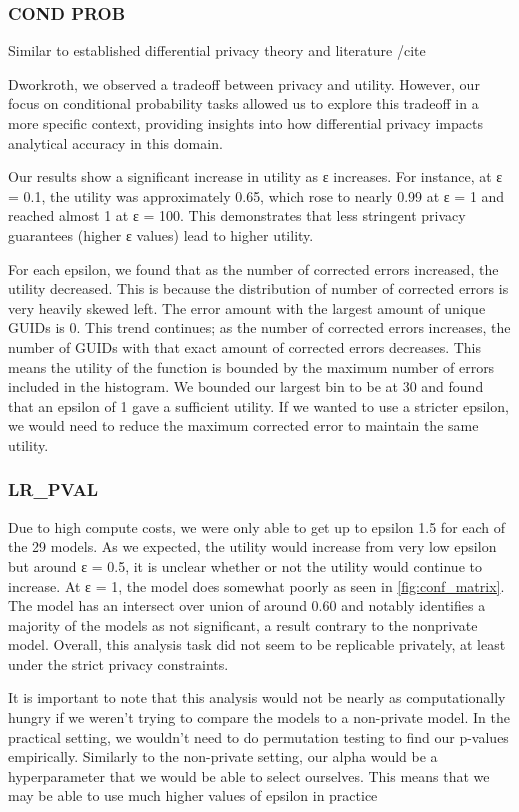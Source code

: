 \documentclass[12pt,letterpaper]{article}
\begin{document}
\subsubsection{COND PROB}
Similar to established differential privacy theory and literature /cite{Dworkroth, we observed a tradeoff between privacy and utility. However, our focus on conditional probability tasks allowed us to explore this tradeoff in a more specific context, providing insights into how differential privacy impacts analytical accuracy in this domain.

Our results show a significant increase in utility as ε increases. For instance, at ε = 0.1, the utility was approximately 0.65, which rose to nearly 0.99 at ε = 1 and reached almost 1 at ε = 100. This demonstrates that less stringent privacy guarantees (higher ε values) lead to higher utility.

For each epsilon, we found that as the number of corrected errors increased, the utility decreased. This is because the distribution of number of corrected errors is very heavily skewed left. The error amount with the largest amount of unique GUIDs is 0. This trend continues; as the number of corrected errors increases, the number of GUIDs with that exact amount of corrected errors decreases. This means the utility of the function is bounded by the maximum number of errors included in the histogram. We bounded our largest bin to be at 30 and found that an epsilon of 1 gave a sufficient utility. If we wanted to use a stricter epsilon, we would need to reduce the maximum corrected error to maintain the same utility. 


\subsubsection{LR_PVAL}
Due to high compute costs, we were only able to get up to epsilon 1.5 for each of the 29 models. As we expected, the utility would increase from very low epsilon but around ε = 0.5, it is unclear whether or not the utility would continue to increase. At ε = 1, the model does somewhat poorly as seen in \ref{fig:conf_matrix}. The model has an intersect over union of around 0.60 and notably identifies a majority of the models as not significant, a result contrary to the nonprivate model. Overall, this analysis task did not seem to be replicable privately, at least under the strict privacy constraints.

It is important to note that this analysis would not be nearly as computationally hungry if we weren't trying to compare the models to a non-private model. In the practical setting, we wouldn't need to do permutation testing to find our p-values empirically. Similarly to the non-private setting, our alpha would be a hyperparameter that we would be able to select ourselves. This means that we may be able to use much higher values of epsilon in practice

}
\end{document}
